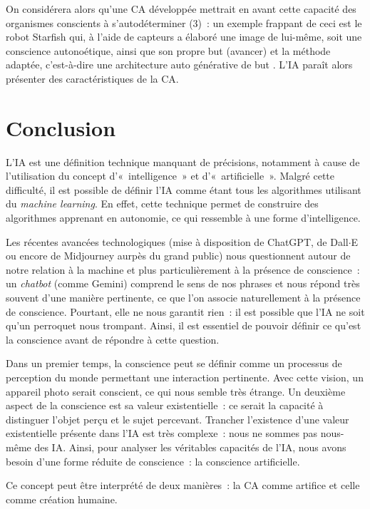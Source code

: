 \documentclass[a4paper, titlepage, 12pt]{article}
\begin{document}
	On considérera alors qu’une CA développée mettrait en avant cette capacité des organismes conscients à s'autodéterminer (3)~: un exemple frappant de ceci est le robot Starfish qui, à l’aide de capteurs a élaboré une image de lui-même, soit une conscience autonoétique, ainsi que son propre but (avancer) et la méthode adaptée, c'est-à-dire une architecture auto générative de but \cite{bongardResilientMachinesContinuous2006}. L'IA paraît alors présenter des caractéristiques de la CA.
	\newpage
	\section{Conclusion}
	L'IA est une définition technique manquant de précisions, notamment à cause de l'utilisation du concept d'«~intelligence~» et d'«~artificielle~». Malgré cette difficulté, il est possible de définir l'IA comme étant tous les algorithmes utilisant du \textit{machine learning}. En effet, cette technique permet de construire des algorithmes apprenant en autonomie, ce qui ressemble à une forme d'intelligence.

	Les récentes avancées technologiques (mise à disposition de ChatGPT, de Dall$\cdot$E ou encore de Midjourney aurpès du grand public) nous questionnent autour de notre relation à la machine et plus particulièrement à la présence de conscience~: un \textit{chatbot} (comme Gemini) comprend le sens de nos phrases et nous répond très souvent d'une manière pertinente, ce que l'on associe naturellement à la présence de conscience. Pourtant, elle ne nous garantit rien~: il est possible que l'IA ne soit qu'un perroquet nous trompant. Ainsi, il est essentiel de pouvoir définir ce qu'est la conscience avant de répondre à cette question.

	Dans un premier temps, la conscience peut se définir comme un processus de perception du monde permettant une interaction pertinente. Avec cette vision, un appareil photo serait conscient, ce qui nous semble très étrange. Un deuxième aspect de la conscience est sa valeur existentielle~: ce serait la capacité à distinguer l'objet perçu et le sujet percevant. Trancher l'existence d'une valeur existentielle présente dans l'IA est très complexe~: nous ne sommes pas nous-même des IA. Ainsi, pour analyser les véritables capacités de l'IA, nous avons besoin d'une forme réduite de conscience~: la conscience artificielle.

	Ce concept peut être interprété de deux manières~: la CA comme artifice et celle comme création humaine.
\end{document}
